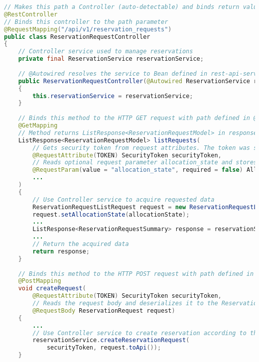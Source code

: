 \begin{lstlisting}[language=java, caption=ReservationRequestController.java, label=lst:controller]
// Makes this path a Controller (auto-detectable) and binds return values of methods to the HTTP request body
@RestController
// Binds this controller to the path parameter
@RequestMapping("/api/v1/reservation_requests")
public class ReservationRequestController
{
    // Controller service used to manage reservations
    private final ReservationService reservationService;
    
    // @Autowired resolves the service to Bean defined in rest-api-servlet.xml
    public ReservationRequestController(@Autowired ReservationService reservationService)
    {
        this.reservationService = reservationService;
    }
    
    // Binds this method to the HTTP GET request with path defined in @RequestMapping
    @GetMapping
    // Method returns ListResponse<ReservationRequestModel> in response body thanks to @RestController annotation
    ListResponse<ReservationRequestModel> listRequests(
        // Gets security token from request attributes. The token was stored there when AuthFilter processed the request.
        @RequestAttribute(TOKEN) SecurityToken securityToken,
        // Reads optional request parameter allocation_state and stores it in allocationState variable
        @RequestParam(value = "allocation_state", required = false) AllocationState allocationState,
        ...
    )
    {
        // Use Controller service to acquire requested data
        ReservationRequestListRequest request = new ReservationRequestListRequest();
        request.setAllocationState(allocationState);
        ...
        ListResponse<ReservationRequestSummary> response = reservationService.listReservationRequests(request);
        ...
        // Return the acquired data
        return response;
    }
    
    // Binds this method to the HTTP POST request with path defined in @RequestMapping
    @PostMapping
    void createRequest(
        @RequestAttribute(TOKEN) SecurityToken securityToken,
        // Reads the request body and deserializes it to the ReservationRequest object
        @RequestBody ReservationRequest request)
    {
        ...
        // Use Controller service to create reservation according to the requested data
        reservationService.createReservationRequest(
            securityToken, request.toApi());
    }
    

\end{lstlisting}
